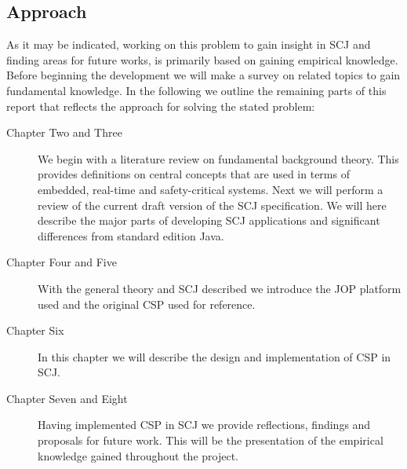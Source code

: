 \subsection{Approach} %
\label{sub:method}
As it may be indicated, working on this problem to gain insight in SCJ and finding areas for future works, is primarily based on gaining empirical knowledge. Before beginning the development we will make a survey on related topics to gain fundamental knowledge. In the following we outline the remaining parts of this report that reflects the approach for solving the stated problem:
\begin{description}
	\item[Chapter Two and Three] We begin with a literature review on fundamental background theory. This provides definitions on central concepts that are used in terms of embedded, real-time and safety-critical systems. Next we will perform a review of the current draft version of the SCJ specification. We will here describe the major parts of developing SCJ applications and significant differences from standard edition Java.
	\item[Chapter Four and Five] With the general theory and SCJ described we introduce the JOP platform used and the original CSP used for reference.
	\item[Chapter Six]  In this chapter we will describe the design and implementation of CSP in SCJ.
	\item[Chapter Seven and Eight] Having implemented CSP in SCJ we provide reflections, findings and proposals for future work. This will be the presentation of the empirical knowledge gained throughout the project.
\end{description}



